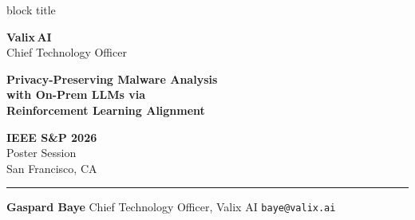 \documentclass[final]{beamer}
\begin{document}
\begin{frame}[t]{}

\begin{beamercolorbox}[wd=\paperwidth, ht=14cm, dp=1cm,
    leftskip=1cm, rightskip=1cm, sep=0pt]{block title}

  \vspace{0.6cm}

  \begin{minipage}[c]{0.16\paperwidth}
    {\fontsize{26}{30}\selectfont\bfseries\color{spaccent} Valix\,AI}\\[0.3em]
    {\small\color{white} Chief Technology Officer}
  \end{minipage}
  \hfill
  \begin{minipage}[c]{0.60\paperwidth}
    \centering
    {\fontsize{30}{38}\selectfont\bfseries\color{white}
      Privacy-Preserving Malware Analysis\\[0.2em]
      with On-Prem LLMs via\\[0.2em]
      Reinforcement Learning Alignment}
  \end{minipage}
  \hfill
  \begin{minipage}[c]{0.16\paperwidth}
    \raggedleft
    {\large\bfseries\color{spaccent} IEEE S\&P 2026}\\[0.3em]
    {\normalsize\color{white} Poster Session}\\[0.3em]
    {\small\color{white} San Francisco, CA}
  \end{minipage}

  \vspace{0.6cm}
  {\color{spaccent}\rule{\linewidth}{1.5pt}}
  \vspace{0.3cm}

  \centering
  {\Large\bfseries\color{white} Gaspard Baye}\quad
  {\normalsize\color{white}
    Chief Technology Officer, Valix AI\quad
    \texttt{baye@valix.ai}}

  \vspace{0.4cm}
\end{beamercolorbox}

\begin{columns}[T]


\end{columns}
\end{frame}
\end{document}
